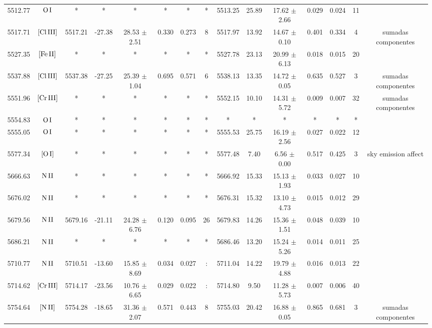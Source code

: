 \documentclass{article}
\begin{document}
\begin{table*}
\begin{adjustbox}{width=\textwidth}
\begin{tabular}{ccccccccccccccc}
5512.77 & $\mbox{O}\thinspace \mbox{I}$ & * & * & * & * & * & * & 5513.25 & 25.89 & 17.62 $\pm$ 2.66 & 0.029 & 0.024 & 11 &  \\
5517.71 & $\mbox{[Cl}\thinspace \mbox{III]}$ & 5517.21 & -27.38 & 28.53 $\pm$ 2.51 & 0.330 & 0.273 & 8 & 5517.97 & 13.92 & 14.67 $\pm$ 0.10 & 0.401 & 0.334 & 4 &  sumadas componentes \\
5527.35 & $\mbox{[Fe}\thinspace \mbox{II]}$ & * & * & * & * & * & * & 5527.78 & 23.13 & 20.99 $\pm$ 6.13 & 0.018 & 0.015 & 20 &  \\
5537.88 & $\mbox{[Cl}\thinspace \mbox{III]}$ & 5537.38 & -27.25 & 25.39 $\pm$ 1.04 & 0.695 & 0.571 & 6 & 5538.13 & 13.35 & 14.72 $\pm$ 0.05 & 0.635 & 0.527 & 3 &  sumadas componentes \\
5551.96 & $\mbox{[Cr}\thinspace \mbox{III]}$ & * & * & * & * & * & * & 5552.15 & 10.10 & 14.31 $\pm$ 5.72 & 0.009 & 0.007 & 32 &  sumadas componentes \\
5554.83 & $\mbox{O}\thinspace \mbox{I}$ & * & * & * & * & * & * & * & * & * & * & * & * &  \\
5555.05 & $\mbox{O}\thinspace \mbox{I}$ & * & * & * & * & * & * & 5555.53 & 25.75 & 16.19 $\pm$ 2.56 & 0.027 & 0.022 & 12 &  \\
5577.34 & $\mbox{[O}\thinspace \mbox{I]}$ & * & * & * & * & * & * & 5577.48 & 7.40 & 6.56 $\pm$ 0.00 & 0.517 & 0.425 & 3 &  sky emission affect \\
5666.63 & $\mbox{N}\thinspace \mbox{II}$ & * & * & * & * & * & * & 5666.92 & 15.33 & 15.13 $\pm$ 1.93 & 0.033 & 0.027 & 10 &  \\
5676.02 & $\mbox{N}\thinspace \mbox{II}$ & * & * & * & * & * & * & 5676.31 & 15.32 & 13.10 $\pm$ 4.73 & 0.015 & 0.012 & 29 &  \\
5679.56 & $\mbox{N}\thinspace \mbox{II}$ & 5679.16 & -21.11 & 24.28 $\pm$ 6.76 & 0.120 & 0.095 & 26 & 5679.83 & 14.26 & 15.36 $\pm$ 1.51 & 0.048 & 0.039 & 10 &  \\
5686.21 & $\mbox{N}\thinspace \mbox{II}$ & * & * & * & * & * & * & 5686.46 & 13.20 & 15.24 $\pm$ 5.26 & 0.014 & 0.011 & 25 &  \\
5710.77 & $\mbox{N}\thinspace \mbox{II}$ & 5710.51 & -13.60 & 15.85 $\pm$ 8.69 & 0.034 & 0.027 & : & 5711.04 & 14.22 & 19.79 $\pm$ 4.88 & 0.016 & 0.013 & 22 &  \\
5714.62 & $\mbox{[Cr}\thinspace \mbox{III]}$ & 5714.17 & -23.56 & 10.76 $\pm$ 6.65 & 0.029 & 0.022 & : & 5714.80 & 9.50 & 11.28 $\pm$ 5.73 & 0.007 & 0.006 & 40 &  \\
5754.64 & $\mbox{[N}\thinspace \mbox{II]}$ & 5754.28 & -18.65 & 31.36 $\pm$ 2.07 & 0.571 & 0.443 & 8 & 5755.03 & 20.42 & 16.88 $\pm$ 0.05 & 0.865 & 0.681 & 3 &  sumadas componentes \\

\end{tabular}
\end{adjustbox}
\end{table*}
\end{document}
